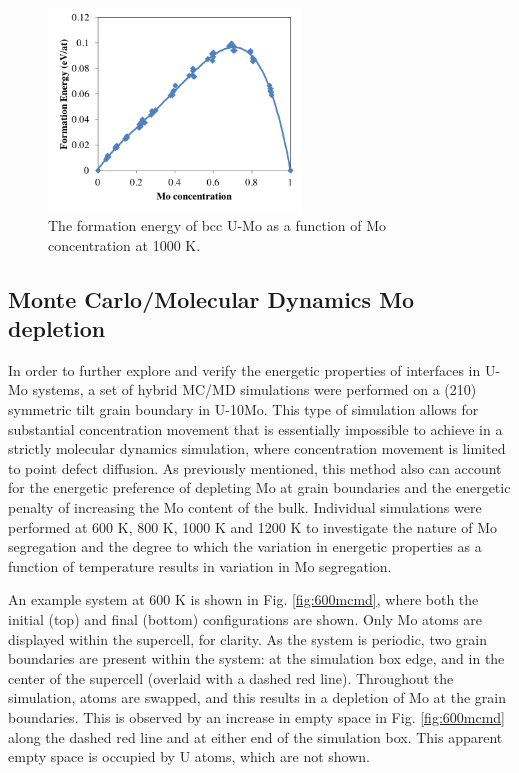 \documentclass[review]{elsarticle}
\begin{document}
\begin{figure}[h]
 \centering
 \includegraphics[width=0.6\textwidth]{umoform.png} 
 \caption{The formation energy of bcc U-Mo as a function of Mo concentration at 1000 K.}
 \label{fig:umoform}
\end{figure}

\subsection{Monte Carlo/Molecular Dynamics Mo depletion}
In order to further explore and verify the energetic properties of interfaces in U-Mo systems, a set of hybrid MC/MD simulations were performed on a (210) symmetric tilt grain boundary in U-10Mo. This type of simulation allows for substantial concentration movement that is essentially impossible to achieve in a strictly molecular dynamics simulation, where concentration movement is limited to point defect diffusion. As previously mentioned, this method also can account for the energetic preference of depleting Mo at grain boundaries and the energetic penalty of increasing the Mo content of the bulk. Individual simulations were performed at 600 K, 800 K, 1000 K and 1200 K to investigate the nature of Mo segregation and the degree to which the variation in energetic properties as a function of temperature results in variation in Mo segregation. 

An example system at 600 K is shown in Fig. \ref{fig:600mcmd}, where both the initial (top) and final (bottom) configurations are shown. Only Mo atoms are displayed within the supercell, for clarity. As the system is periodic, two grain boundaries are present within the system: at the simulation box edge, and in the center of the supercell (overlaid with a dashed red line). Throughout the simulation, atoms are swapped, and this results in a depletion of Mo at the grain boundaries. This is observed by an increase in empty space in Fig. \ref{fig:600mcmd} along the dashed red line and at either end of the simulation box. This apparent empty space is occupied by U atoms, which are not shown.
\end{document}
